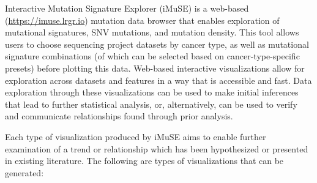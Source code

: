 \documentclass[12pt, letterpaper]{article}
\begin{document}
Interactive Mutation Signature Explorer (iMuSE) is a web-based (\url{https://imuse.lrgr.io}) mutation data browser that enables exploration of mutational signatures, SNV mutations, and mutation density.
This tool allows users to choose sequencing project datasets by cancer type, as well as mutational signature combinations (of which can be selected based on cancer-type-specific presets) before plotting this data. 
Web-based interactive visualizations allow for exploration across datasets and features in a way that is accessible and fast.
Data exploration through these visualizations can be used to make initial inferences that lead to further statistical analysis, or, alternatively, can be used to verify and communicate relationships found through prior analysis.

Each type of visualization produced by iMuSE aims to enable further examination of a trend or relationship which has been hypothesized or presented in existing literature.
The following are types of visualizations that can be generated:
\end{document}
